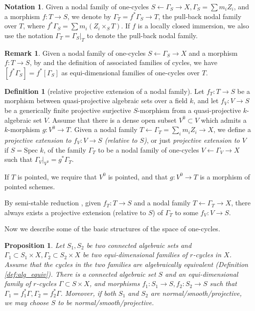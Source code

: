 \documentclass{amsart}
\newtheorem{prop}[theorem]{Proposition}
\theoremstyle{definition}
\newtheorem{defn}[theorem]{Definition}
\newtheorem{rem}[theorem]{Remark}
\newtheorem{notat}[theorem]{Notation}
\theoremstyle{remark}
\newcommand{\SP}{\text{Spec }}
\begin{document}
\begin{notat}
    Given a nodal family of one-cycles $S \leftarrow\Gamma_S \to X, \Gamma_S =\sum m_i Z_i$, and a morphism $f: T \to S$, we denote by $\Gamma_T=f^*\Gamma_S \to T$, the pull-back nodal family over $T$, where $f^*\Gamma_S=\sum m_i (Z_i \times_S T)$. 
If $f$ is a locally closed immersion, we also use the notation $\Gamma_T=\Gamma_S|_T$ to denote the pull-back nodal family.
\end{notat}
    

\begin{rem}
    Given a nodal family of one-cycles $S \leftarrow\Gamma_S \to X$ and a morphism $f: T \to S$, by \cite[Lemma 3.3.10]{SV_Chow_Sheaves} and the definition of associated families of cycles,  we have $[f^*\Gamma_S]=f^*[\Gamma_S]$ as equi-dimensional families of one-cycles over $T$. 
\end{rem}


\begin{defn}[relative projective extension of a nodal family]\label{def:extension}
    Let $f_T: T \to S$ be a morphism between quasi-projective algebraic sets over a field $k$,
    and let $f_V: V\to S$ be a generically finite projective surjective $S$-morphism from a quasi-projective $k$-algebraic set $V$.
    Assume that there is a dense open subset $V^0 \subset V$ which admits a $k$-morphism $g: V^0 \to T$.
    Given a nodal family $T \leftarrow \Gamma_T=\sum_i m_i Z_i \to X$,
    we define a \emph{projective extension to $f_V: V \to S$ (relative to $S$)}, or just \emph{projective extension to $V$} if $S=\SP k$, of the family $\Gamma_T$ to be a nodal family of one-cycles $V \leftarrow \Gamma_V \to X$ such that $\Gamma_V|_{V^0}=g^*\Gamma_T$.
    
    If $T$ is pointed, we require that $V^0$ is pointed, and that $g: V^0 \to T$ is a morphism of pointed schemes.
\end{defn}
By semi-stable reduction \cite[Theorem 5.8]{deJong_alteration}, given $f_T: T \to S$ and a nodal family $T \leftarrow \Gamma_T \to X$, there always exists a projective extension (relative to $S$) of $\Gamma_T$ to some $f_V: V \to S$.


Now we describe some of the basic structures of the space of one-cycles.
\begin{prop}\label{prop:filter_1}
Let $S_1, S_2$ be two connected algebraic sets and $\Gamma_1 \subset S_1 \times X, \Gamma_2 \subset S_2 \times X$ be two equi-dimensional families of $r$-cycles in $X$.
Assume that the cycles in the two families are algebraically equivalent (Definition \ref{def:alg_equiv}).
There is a connected algebraic set $S$ and an equi-dimensional family of $r$-cycles $\Gamma \subset S \times X$, and morphisms $f_1: S_1 \to S, f_2: S_2\to S$ such that $\Gamma_1=f_1^* \Gamma, \Gamma_2=f_2^* \Gamma$. Moreover, if both $S_1$ and $S_2$ are normal/smooth/projective, we may choose $S$ to be normal/smooth/projective.
\end{prop}
\end{document}
